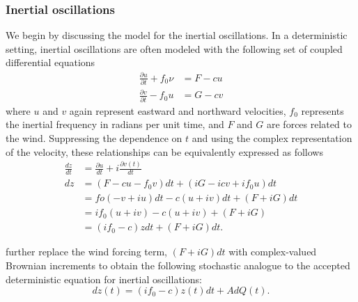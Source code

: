 \documentclass{stat572Style}
\begin{document}
\subsubsection{Inertial oscillations}
We begin by discussing the model for the inertial oscillations. 
In a deterministic setting, inertial oscillations are often modeled with the following set of coupled differential equations \citep{Pollard1970}
\begin{align}
\frac{\partial u }{\partial t}  + f_{0} \nu &= F - cu \\ \nonumber
\frac{\partial v}{\partial t} - f_{0}u &= G - cv
\end{align}
where $u$ and $v$ again represent eastward and northward velocities, $f_{0}$ represents the inertial frequency in radians per unit time, and $F$ and $G$ are forces related to the wind. 
Suppressing the dependence on $t$ and using the complex representation of the velocity,  these relationships can be equivalently expressed as follows
\begin{align}
\label{eq:diffEqDeriv}
\frac{dz}{dt} &= \frac{\partial u}{dt} + i\frac{\partial v(t)}{dt}\\ \nonumber
dz &= (F - c u- f_{0}v)dt + (iG - icv + if_{0}u)dt\\ \nonumber
&= fo(-v + iu)dt - c(u + iv)dt + (F + iG)dt\\ \nonumber
&= if_{0}(u + iv) - c(u + iv) + (F + iG)\\ \nonumber
&= (if_{0} - c)z dt + (F + iG)dt. 
\end{align}

 \citet{Sykulski2016} further replace the wind forcing term, $(F + iG)dt$  with complex-valued Brownian increments \citep{Mandelbrot1968} to obtain  the following stochastic analogue to the accepted deterministic equation for inertial oscillations:
 \begin{equation}
\label{eq:ouEq}
dz(t) = (i f_{0} -c) z(t) dt + A d Q(t). 
\end{equation}  
\end{document}
